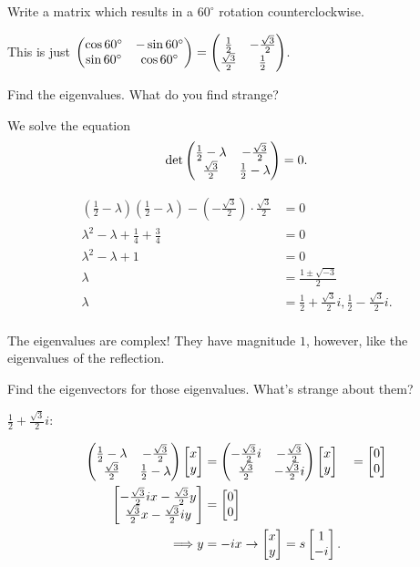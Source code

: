 \documentclass[../gatm_answers.tex]{subfiles}
\begin{document}
\begin{outer_problem}
\item
\end{outer_problem}

\begin{inner_problem}[start=1]
\item Write a matrix which results in a $60^\circ$ rotation counterclockwise.
\end{inner_problem}

This is just $\begin{pmatrix} \cos 60^\circ & -\sin 60^\circ \\ \sin 60^\circ & \cos 60^\circ \end{pmatrix}=\begin{pmatrix} \frac{1}{2} & -\frac{\sqrt{3}}{2} \\ \frac{\sqrt{3}}{2} & \frac{1}{2} \end{pmatrix}$.

\begin{inner_problem}
\item Find the eigenvalues. What do you find strange?
\end{inner_problem}

We solve the equation $$\det \begin{pmatrix} \frac{1}{2} - \lambda & -\frac{\sqrt{3}}{2} \\ \frac{\sqrt{3}}{2} & \frac{1}{2} - \lambda \end{pmatrix} = 0.$$

\begin{align*}
\left(\frac{1}{2} - \lambda\right)\left(\frac{1}{2} - \lambda\right)-\left(-\frac{\sqrt{3}}{2}\right)\cdot \frac{\sqrt{3}}{2} &= 0 \\
\lambda^2 - \lambda + \frac{1}{4} + \frac{3}{4} &= 0 \\
\lambda^2 - \lambda + 1 &= 0 \\
\lambda &= \frac{1\pm\sqrt{-3}}{2} \\
\lambda &= \frac{1}{2} + \frac{\sqrt{3}}{2}i, \frac{1}{2} - \frac{\sqrt{3}}{2}i.\\
\end{align*}

The eigenvalues are complex! They have magnitude $1$, however, like the eigenvalues of the reflection.

\begin{inner_problem}
\item Find the eigenvectors for those eigenvalues. What's strange about them?
\end{inner_problem}

$\frac{1}{2} + \frac{\sqrt{3}}{2}i:$

\begin{align*}
\begin{pmatrix} \frac{1}{2} - \lambda & -\frac{\sqrt{3}}{2} \\ \frac{\sqrt{3}}{2} & \frac{1}{2} - \lambda \end{pmatrix}\begin{bmatrix} x \\ y \end{bmatrix} &= \begin{pmatrix} -\frac{\sqrt{3}}{2}i & -\frac{\sqrt{3}}{2} \\ \frac{\sqrt{3}}{2} & -\frac{\sqrt{3}}{2}i \end{pmatrix}\begin{bmatrix} x \\ y \end{bmatrix} &= \begin{bmatrix} 0 \\ 0 \end{bmatrix} \\
\begin{bmatrix} -\frac{\sqrt{3}}{2}ix-\frac{\sqrt{3}}{2}y \\ \frac{\sqrt{3}}{2}x-\frac{\sqrt{3}}{2}iy \end{bmatrix} &= \begin{bmatrix} 0 \\ 0 \end{bmatrix} \\
\Longrightarrow y &= -ix \rightarrow \begin{bmatrix} x \\ y \end{bmatrix} = s\begin{bmatrix} 1 \\ -i \end{bmatrix}.
\end{align*}
\end{document}
